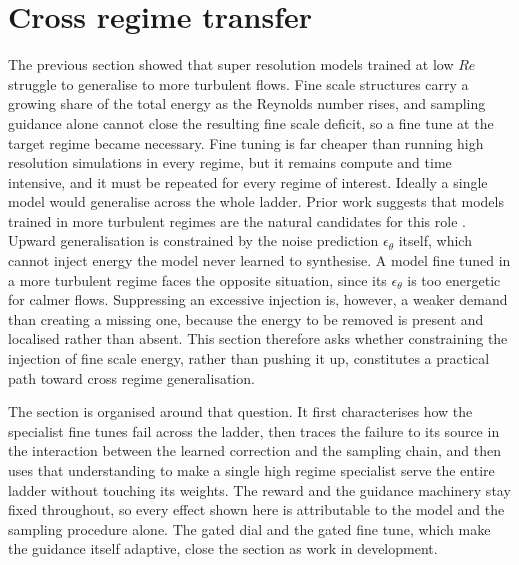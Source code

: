 
\section{Cross regime transfer}
\label{sec:transfer}

The previous section showed that super resolution models trained at low $Re$
struggle to generalise to more turbulent flows. Fine scale structures carry a
growing share of the total energy as the Reynolds number rises, and sampling
guidance alone cannot close the resulting fine scale deficit, so a fine tune
at the target regime became necessary. Fine tuning is far cheaper than running
high resolution simulations in every regime, but it remains compute and time
intensive, and it must be repeated for every regime of interest. Ideally a
single model would generalise across the whole ladder. Prior work suggests
that models trained in more turbulent regimes are the natural candidates for
this role \cite{}. Upward generalisation is constrained by the noise
prediction $\epsilon_\theta$ itself, which cannot inject energy the model
never learned to synthesise. A model fine tuned in a more turbulent regime
faces the opposite situation, since its $\epsilon_\theta$ is too energetic for
calmer flows. Suppressing an excessive injection is, however, a weaker demand
than creating a missing one, because the energy to be removed is present and
localised rather than absent. This section therefore asks whether constraining
the injection of fine scale energy, rather than pushing it up, constitutes a
practical path toward cross regime generalisation.

The section is organised around that question. It first characterises how the
specialist fine tunes fail across the ladder, then traces the failure to its
source in the interaction between the learned correction and the sampling
chain, and then uses that understanding to make a single high regime
specialist serve the entire ladder without touching its weights. The reward
and the guidance machinery stay fixed throughout, so every effect shown here
is attributable to the model and the sampling procedure alone. The gated dial
and the gated fine tune, which make the guidance itself adaptive, close the
section as work in development.

